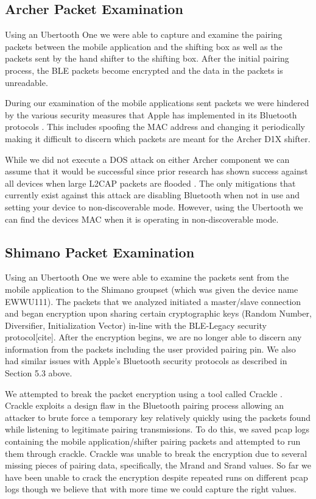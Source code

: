 \documentclass[letterpaper,twocolumn,10pt]{article}
\begin{document}
\subsection{Archer Packet Examination}

Using an Ubertooth One we were able to capture and examine the pairing packets between the mobile application and the shifting box as well as the packets sent by the hand shifter to the shifting box. After the initial pairing process, the BLE packets become encrypted and the data in the packets is unreadable.

During our examination of the mobile applications sent packets we were hindered by the various security measures that Apple has implemented in its Bluetooth protocols \cite{appleblesecurity}. This includes spoofing the MAC address and changing it periodically making it difficult to discern which packets are meant for the Archer D1X shifter. 

While we did not execute a DOS attack on either Archer component we can assume that it would be successful since prior research has shown success against all devices when large L2CAP packets are flooded \cite{bluesmack}. The only mitigations that currently exist against this attack are disabling Bluetooth when not in use and setting your device to non-discoverable mode. However, using the Ubertooth we can find the devices MAC when it is operating in non-discoverable mode. 

\subsection{Shimano Packet Examination}

Using an Ubertooth One we were able to examine the packets sent from the mobile application to the Shimano groupset (which was given the device name EWWU111). The packets that we analyzed initiated a master/slave connection and began encryption upon sharing certain cryptographic keys (Random Number, Diversifier, Initialization Vector) in-line with the BLE-Legacy security protocol[cite]. After the encryption begins, we are no longer able to discern any information from the packets including the user provided pairing pin. We also had similar issues with Apple’s Bluetooth security protocols as described in Section 5.3 above. 

We attempted to break the packet encryption using a tool called Crackle \cite{crackle}. Crackle exploits a design flaw in the Bluetooth pairing process allowing an attacker to brute force a temporary key relatively quickly using the packets found while listening to legitimate pairing transmissions. To do this, we saved pcap logs containing the mobile application/shifter pairing packets and attempted to run them through crackle. Crackle was unable to break the encryption due to several missing pieces of pairing data, specifically, the Mrand and Srand values. So far we have been unable to crack the encryption despite repeated runs on different pcap logs though we believe that with more time we could capture the right values. 
\end{document}
